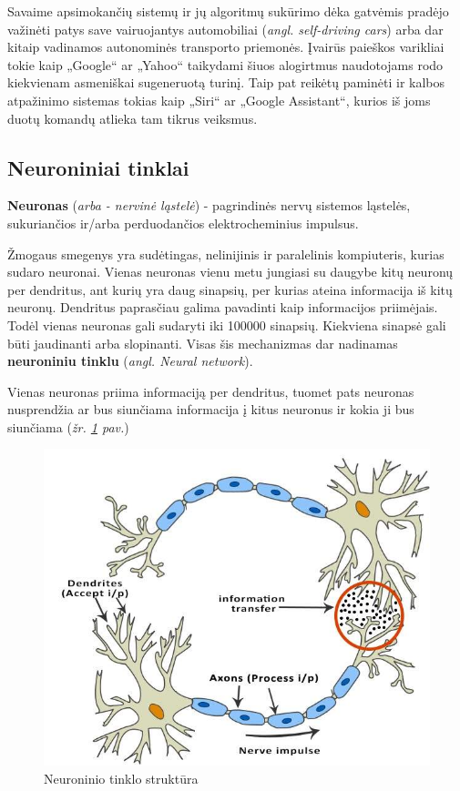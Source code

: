 \documentclass{VUMIFInfKursinis}
\begin{document}
Savaime apsimokančių sistemų ir jų algoritmų sukūrimo dėka gatvėmis pradėjo važinėti patys save vairuojantys automobiliai (\textit{angl. self-driving cars}) arba dar kitaip vadinamos autonominės transporto priemonės. Įvairūs paieškos varikliai tokie kaip „Google“ ar „Yahoo“ taikydami šiuos alogirtmus naudotojams rodo kiekvienam asmeniškai sugeneruotą turinį. Taip pat reikėtų paminėti ir kalbos atpažinimo sistemas tokias kaip „Siri“ ar „Google Assistant“, kurios iš joms duotų komandų atlieka tam tikrus veiksmus.

\subsection{Neuroniniai tinklai}
\textbf{Neuronas} (\textit{arba - nervinė ląstelė}) - pagrindinės nervų sistemos ląstelės, sukuriančios ir/arba perduodančios elektrocheminius impulsus.



Žmogaus smegenys yra sudėtingas, nelinijinis ir paralelinis kompiuteris\cite{Hay09}, kurias sudaro neuronai. Vienas neuronas vienu metu jungiasi su daugybe kitų neuronų per dendritus, ant kurių yra daug sinapsių, per kurias ateina informacija iš kitų neuronų. Dendritus paprasčiau galima pavadinti kaip informacijos priimėjais. Todėl vienas neuronas gali sudaryti iki 100000 sinapsių. Kiekviena sinapsė gali būti jaudinanti arba slopinanti. Visas šis mechanizmas dar nadinamas \textbf{neuroniniu tinklu} (\textit{angl. Neural network}).

Vienas neuronas priima informaciją per dendritus, tuomet pats neuronas nusprendžia ar bus siunčiama informacija į kitus neuronus ir kokia ji bus siunčiama (\textit{žr. \ref{img:neuron_structure} pav.})

\begin{figure}[H]
	\centering
	\includegraphics[width=.5\linewidth]{img/neuron-structure}
	\caption[]{Neuroninio tinklo struktūra\footnotemark}
	\label{img:neuron_structure}
\end{figure}
\end{document}
